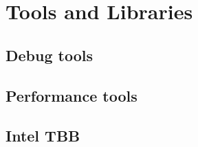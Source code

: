 \section{Tools and Libraries}
\label{sec:tools}

\subsection{Debug tools}
\label{subsec:debugtools}

\subsection{Performance tools}
\label{subsec:perftools}

\subsection{Intel TBB}
\label{subsec:tbb}
